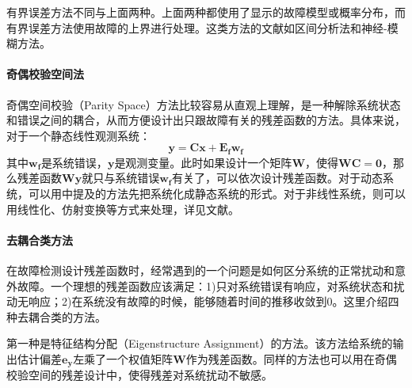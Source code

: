 有界误差方法不同与上面两种。上面两种都使用了显示的故障模型或概率分布，而有界误差方法使用故障的上界进行处理。这类方法的文献如区间分析法\cite{4547434}和神经-模糊方法\cite{Korbicz2007609}。

\paragraph*{奇偶校验空间法}奇偶空间校验（Parity Space）方法比较容易从直观上理解，是一种解除系统状态和错误之间的耦合，从而方便设计出只跟故障有关的残差函数\cite{patton1991review,GERTLER1995627}的方法。具体来说，对于一个静态线性观测系统：
\begin{equation*}
    \mathbf{y} = \mathbf{Cx} + \mathbf{E_fw_f}
\end{equation*}
其中$\mathbf{w_f}$是系统错误，$\mathbf{y}$是观测变量。此时如果设计一个矩阵$\mathbf{W}$，使得$\mathbf{WC=0}$，那么残差函数$\mathbf{Wy}$就只与系统错误$\mathbf{w_f}$有关了，可以依次设计残差函数。对于动态系统，可以用中提及的方法先把系统化成静态系统的形式。对于非线性系统，则可以用线性化、仿射变换等方式来处理，详见文献。

\paragraph*{去耦合类方法}在故障检测设计残差函数时，经常遇到的一个问题是如何区分系统的正常扰动和意外故障。一个理想的残差函数应该满足\cite{1104419}：1)只对系统错误有响应，对系统状态和扰动无响应；2)在系统没有故障的时候，能够随着时间的推移收敛到0。这里介绍四种去耦合类的方法。

第一种是特征结构分配（Eigenstructure Assignment）的方法\cite{261546}。该方法给系统的输出估计偏差$\mathbf{e_y}$左乘了一个权值矩阵$\mathbf{W}$作为残差函数\cite{261546,RNC:RNC523}。同样的方法也可以用在奇偶校验空间的残差设计中，使得残差对系统扰动不敏感\cite{doi:10.1080/00207179508921908}。

